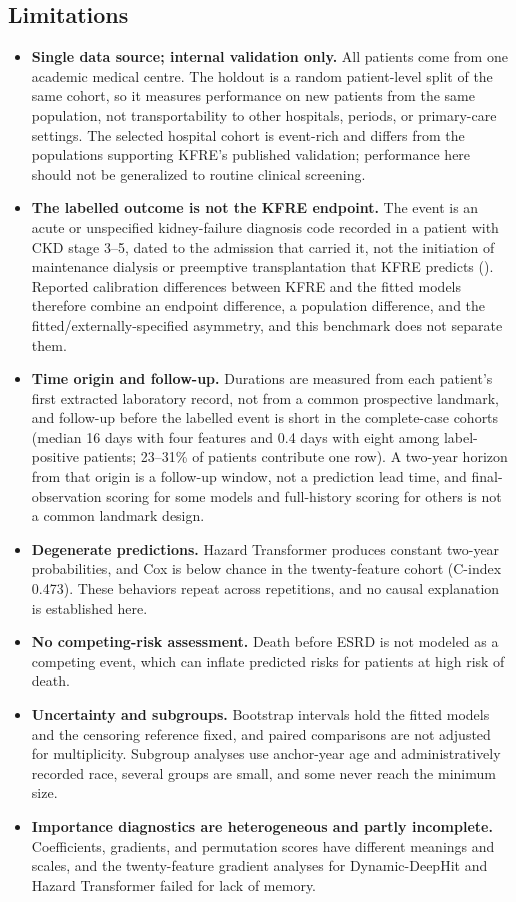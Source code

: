 \documentclass[10pt,letterpaper]{article}
\begin{document}
\subsection*{Limitations} \label{sec:limitations}

\begin{itemize}
    \item \textbf{Single data source; internal validation only.} All patients come from one academic medical centre. The holdout is a random patient-level split of the same cohort, so it measures performance on new patients from the same population, not transportability to other hospitals, periods, or primary-care settings. The selected hospital cohort is event-rich and differs from the populations supporting KFRE's published validation; performance here should not be generalized to routine clinical screening.
    \item \textbf{The labelled outcome is not the KFRE endpoint.} The event is an acute or unspecified kidney-failure diagnosis code recorded in a patient with CKD stage 3--5, dated to the admission that carried it, not the initiation of maintenance dialysis or preemptive transplantation that KFRE predicts (). Reported calibration differences between KFRE and the fitted models therefore combine an endpoint difference, a population difference, and the fitted/externally-specified asymmetry, and this benchmark does not separate them.
    \item \textbf{Time origin and follow-up.} Durations are measured from each patient's first extracted laboratory record, not from a common prospective landmark, and follow-up before the labelled event is short in the complete-case cohorts (median 16 days with four features and 0.4 days with eight among label-positive patients; 23--31\% of patients contribute one row). A two-year horizon from that origin is a follow-up window, not a prediction lead time, and final-observation scoring for some models and full-history scoring for others is not a common landmark design.
    \item \textbf{Degenerate predictions.} Hazard Transformer produces constant two-year probabilities, and Cox is below chance in the twenty-feature cohort (C-index 0.473). These behaviors repeat across repetitions, and no causal explanation is established here.
    \item \textbf{No competing-risk assessment.} Death before ESRD is not modeled as a competing event, which can inflate predicted risks for patients at high risk of death.
    \item \textbf{Uncertainty and subgroups.} Bootstrap intervals hold the fitted models and the censoring reference fixed, and paired comparisons are not adjusted for multiplicity. Subgroup analyses use anchor-year age and administratively recorded race, several groups are small, and some never reach the minimum size.
    \item \textbf{Importance diagnostics are heterogeneous and partly incomplete.} Coefficients, gradients, and permutation scores have different meanings and scales, and the twenty-feature gradient analyses for Dynamic-DeepHit and Hazard Transformer failed for lack of memory.
\end{itemize}
\end{document}
